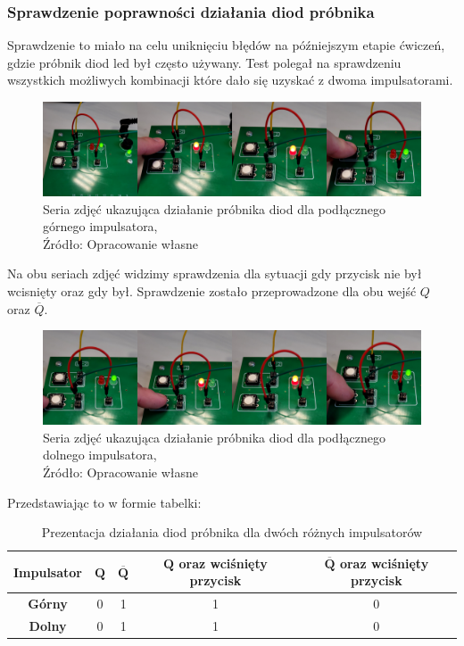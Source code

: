 \documentclass{article}
\begin{document}
    \subsubsection{Sprawdzenie poprawności działania diod próbnika}
      Sprawdzenie to miało na celu uniknięciu błędów na późniejszym etapie ćwiczeń, gdzie próbnik diod led był często używany. Test polegał na sprawdzeniu wszystkich możliwych kombinacji które dało się uzyskać z dwoma impulsatorami.
      
      \begin{figure}[!ht]
        \centering
        \includegraphics[scale=0.15]{grafiki/imp_gora_test.png}
        \caption{Seria zdjęć ukazująca działanie próbnika diod dla podłącznego górnego impulsatora,
        \\Źródło: Opracowanie własne}
      \end{figure}

      Na obu seriach zdjęć widzimy sprawdzenia dla sytuacji gdy przycisk nie był wcisnięty oraz gdy był. Sprawdzenie zostało przeprowadzone dla obu wejść $Q$ oraz $\overline{Q}$.
    
      \begin{figure}[!ht]
        \centering
        \includegraphics[scale=0.15]{grafiki/imp_dol_test.png}
        \caption{Seria zdjęć ukazująca działanie próbnika diod dla podłącznego dolnego impulsatora,
        \\Źródło: Opracowanie własne}
      \end{figure}

      Przedstawiając to w formie tabelki:

      \begin{table}[h]
        \centering
        \begin{tabular}{|c|c|c|c|c|}
        \hline
        \footnotesize \textbf{Impulsator}  & \footnotesize $\mathbf{Q}$ & \footnotesize $\mathbf{\overline{Q}}$ & \footnotesize $\mathbf{Q}$ oraz wciśnięty przycisk& \footnotesize $\mathbf{\overline{Q}}$ oraz wciśnięty przycisk \\
        \hline
        \textbf{Górny} & 0 & 1 & 1 & 0\\
        \hline
        \textbf{Dolny} & 0 & 1 & 1 & 0\\
        \hline
        \end{tabular}
        \caption{Prezentacja działania diod próbnika dla dwóch różnych impulsatorów}
      \end{table}
\end{document}
